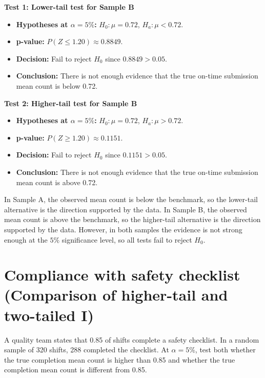 \textbf{Test 1: Lower-tail test for Sample B}

\begin{itemize}
	\item \textbf{Hypotheses at \(\alpha=5\%\):} \(H_0\colon \mu=0.72\), \(H_a\colon \mu<0.72\).
	\item \textbf{p-value:} \(P(Z\le 1.20)\approx 0.8849\).
	\item \textbf{Decision:} Fail to reject \(H_0\) since \(0.8849>0.05\).
	\item \textbf{Conclusion:} There is not enough evidence that the true on-time submission mean count is below 0.72.
\end{itemize}

\begin{center}
\end{center}


\textbf{Test 2: Higher-tail test for Sample B}

\begin{itemize}
	\item \textbf{Hypotheses at \(\alpha=5\%\):} \(H_0\colon \mu=0.72\), \(H_a\colon \mu>0.72\).
	\item \textbf{p-value:} \(P(Z\ge 1.20)\approx 0.1151\).
	\item \textbf{Decision:} Fail to reject \(H_0\) since \(0.1151>0.05\).
	\item \textbf{Conclusion:} There is not enough evidence that the true on-time submission mean count is above 0.72.
\end{itemize}

\begin{center}
\end{center}


In Sample A, the observed mean count is below the benchmark, so the lower-tail alternative is the direction supported by the data. In Sample B, the observed mean count is above the benchmark, so the higher-tail alternative is the direction supported by the data. However, in both samples the evidence is not strong enough at the \(5\%\) significance level, so all tests fail to reject \(H_0\).

\section{Compliance with safety checklist (Comparison of higher-tail and two-tailed I)}
A quality team states that 0.85 of shifts complete a safety checklist. In a random sample of 320 shifts, 288 completed the checklist. At \(\alpha=5\%\), test both whether the true completion mean count is higher than 0.85 and whether the true completion mean count is different from 0.85.

